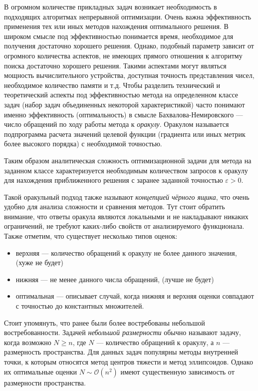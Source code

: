 
{\actuality} 
В огромном количестве прикладных задач возникает необходимость в подходящих алгоритмах непрерывной оптимизации. Очень важна эффективность применения тех или иных методов нахождения оптимального решения. В широком смысле под эффективностью понимается время, необходимое для получения достаточно хорошего решения. Однако, подобный параметр зависит от огромного количества аспектов, не имеющих прямого отношения к алгоритму поиска достаточно хорошего решения. Такими аспектами могут являться мощность вычислительного устройства, доступная точность представления чисел, необходимое количество памяти и т.д. Чтобы разделить технический и теоретический аспекты под эффективностью метода на определенном классе задач (набор задач объединенных некоторой характеристикой) часто понимают именно эффективность (оптимальность) в смысле Бахвалова-Немировского \cite{Nemirovski1979} --- число обращений по ходу работы метода к \textit{оракулу}. Оракулом называется подпрограмма расчета значений целевой функции (градиента или иных метрик более высокого порядка) с необходимой точностью.

Таким образом аналитическая сложность оптимизационной задачи для метода на заданном классе характеризуется необходимым количеством запросов к оракулу для нахождения приближенного решения с заранее заданной точностью $\varepsilon > 0$.

Такой оракульный подход также называют \textit{концепцией чёрного ящика}, что очень удобно для анализа сложности и сравнения методов. Тут стоит обратить внимание, что ответы оракула являются локальными и не накладывают никаких ограничений, не требуют каких-либо свойств от анализируемого функционала. Также отметим, что существует несколько типов оценок:
\begin{itemize}
    \item верхняя --- количество обращений к оракулу не более данного значения, (хуже не будет)
    \item нижняя --- не менее данного числа обращений, (лучше не будет)
    \item оптимальная --- описывает случай, когда нижняя и верхняя оценки совпадают с точностью до константных множителей.
\end{itemize}

Стоит упомянуть, что ранее были более востребованы небольшой востребованности. Задачей \textit{небольшой размерности} обычно называют задачу, когда возможно $N \geq n$, где $N$ --- количество обращений к оракулу, а $n$ --- размерность пространства. Для данных задач популярны методы внутренней точки, к которым относятся метод центров тяжести и метод эллипсоидов. Однако их оптимальные оценки $N \sim \mathcal{O}\left(n^2\right)$ имеют существенную зависимость от размерности пространства. \cite{bubeck_2015}

